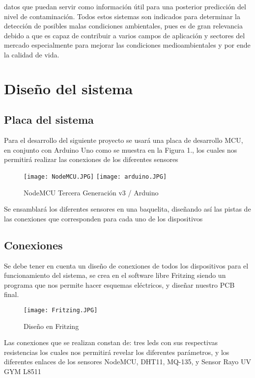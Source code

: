 \documentclass[10pt,a4paper]{article}
\begin{document}
datos que puedan servir como información útil para una posterior predicción del nivel de contaminación. Todos estos sistemas son indicados para determinar la detección de posibles malas condiciones ambientales, pues es de gran relevancia debido a que es capaz de contribuir a varios campos de aplicación y sectores del mercado especialmente para mejorar las condiciones medioambientales y por ende la calidad de vida. 

\section{Diseño del sistema}
\subsection{Placa del sistema}

Para el desarrollo del siguiente proyecto se usará una placa de desarrollo MCU, en conjunto con Arduino Uno como se muestra en la Figura 1., los cuales nos permitirá realizar las conexiones de los diferentes sensores


\begin{figure}[H]
\centering
 \texttt{[image: NodeMCU.JPG]} 
 \texttt{[image: arduino.JPG]} 
\caption{NodeMCU Tercera Generación v3  /  Arduino} 
\end{figure}

Se ensamblará los diferentes sensores en una baquelita, diseñando así las pistas de las conexiones que corresponden para cada uno de los dispositivos

\subsection{Conexiones}

Se debe tener en cuenta un diseño de conexiones de todos los dispositivos para el funcionamiento del sistema, se crea en el software libre Fritzing siendo un programa que nos permite hacer esquemas eléctricos, y diseñar nuestro PCB final.

\begin{figure}[H]
\centering
 \texttt{[image: Fritzing.JPG]} 
\caption{Diseño en Fritzing} 
\end{figure}

Las conexiones que se realizan constan de: tres leds con sus respectivas resistencias los cuales nos permitirá revelar los diferentes parámetros, y los diferentes enlaces de los sensores NodeMCU, DHT11, MQ-135, y Sensor Rayo UV GYM L8511
\end{document}
